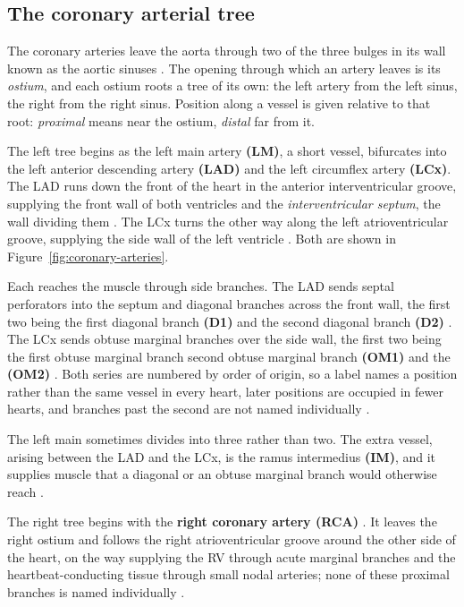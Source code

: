 \subsection{The coronary arterial tree}
\label{sec:tree}

The coronary arteries leave the aorta through two of the three bulges in its wall known as the
aortic sinuses \cite{devos2024coronary}.
The opening through which an artery leaves is its \emph{ostium}, and each ostium roots a tree of its
own: the left artery from the left sinus, the right from the right sinus.
Position along a vessel is given relative to that root: \emph{proximal} means near the ostium,
\emph{distal} far from it.

The left tree begins as the left main artery \textbf{(LM)}, a short vessel, bifurcates into the
left anterior descending artery \textbf{(LAD)} and the left circumflex artery \textbf{(LCx)}.
The LAD runs down the front of the heart in the anterior
interventricular groove, supplying the front wall of both ventricles and the
\emph{interventricular septum}, the wall dividing them \cite{devos2024coronary,obrien2007anatomy}.
The LCx turns the other way along the left atrioventricular
groove, supplying the side wall of the left ventricle \cite{obrien2007anatomy,allwork1987applied}.
Both are shown in Figure~\ref{fig:coronary-arteries}.

Each reaches the muscle through side branches.
The LAD sends septal perforators into the septum and diagonal branches across the front wall, the
first two being the first diagonal branch \textbf{ (D1)} and the second diagonal branch \textbf{ (D2)}
\cite{devos2024coronary,obrien2007anatomy}.
The LCx sends obtuse marginal branches over the side wall, the first two being the first obtuse marginal branch second obtuse marginal branch
\textbf{ (OM1)} and the \textbf{ (OM2)}
\cite{obrien2007anatomy}.
Both series are numbered by order of origin, so a label names a position rather than the same vessel
in every heart, later positions are occupied in fewer hearts, and branches past the second are not
named individually \cite{devos2024coronary}.

The left main sometimes divides into three rather than two.
The extra vessel, arising between the LAD and the LCx, is the ramus intermedius \textbf{ (IM)}, and
it supplies muscle that a diagonal or an obtuse marginal branch would otherwise reach
\cite{obrien2007anatomy}.

The right tree begins with the \textbf{right coronary artery (RCA)} \cite{obrien2007anatomy}.
It leaves the right ostium and follows the right atrioventricular groove around the other side of
the heart, on the way supplying the RV through acute marginal branches and the
heartbeat-conducting tissue through small nodal arteries; none of these proximal branches is named
individually \cite{devos2024coronary,obrien2007anatomy}.


